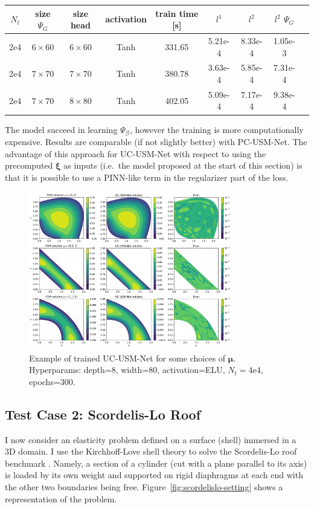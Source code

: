 \documentclass[11pt]{article}
\begin{document}
\begin{center}
\begin{tabular}{ |c|c|c|c|c|c|c|c|c| } 
 $N_t$ & size $\Psi_G$ & size head & activation & train time [s] & $l^1$ & $l^2$ & $l^2$ $\Psi_G$\\ 
 \hline
 2e4 & $6\times 60$ & $6\times 60$ & Tanh & 331.65 & 5.21e-4 & 8.33e-4 & 1.05e-3\\
 2e4 & $7\times 70$ & $7\times 70$ & Tanh & 380.78 & 3.63e-4 & 5.85e-4 & 7.31e-4\\
 2e4 & $7\times 70$ & $8\times 80$ & Tanh & 402.05 & 5.09e-4 & 7.17e-4 & 9.38e-4\\
\end{tabular}
\end{center}
The model succeed in learning $\Psi_{\mathcal G}$, however the training is more computationally expensive. Results are comparable (if not slightly better) with PC-USM-Net. The advantage of this approach for UC-USM-Net with respect to using the precomputed $\boldsymbol \xi$ as inputs (i.e.\ the model proposed at the start of this section) is that it is possible to use a PINN-like term in the regularizer part of the loss. 

\begin{figure}[t]
    \centering
    \includegraphics[width=0.8\textwidth]{imgs/lapl_pinn_trained.pdf}
    \caption{Example of trained UC-USM-Net for some choices of $\boldsymbol \mu$. Hyperparams: depth=8, width=80, activation=ELU, $N_t=$4e4, epochs=300.}
    \label{fig:usmnet-trained}
\end{figure}

\subsection{Test Case 2: Scordelis-Lo Roof}
I now consider an elasticity problem defined on a surface (shell) immersed in a 3D domain. I use the Kirchhoff-Love shell theory \cite{kiendl2009isogeometric} to solve the Scordelis-Lo roof benchmark \cite{scordelis1964computer, belytschko1985stress}. Namely, a section of a cylinder (cut with a plane parallel to its axis) is loaded by its own weight and supported on rigid diaphragms at each end with the other two boundaries being free. Figure~\ref{fig:scordelislo-setting} shows a representation of the problem. 
\end{document}
